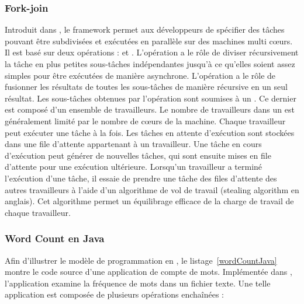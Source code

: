 \subsubsection{Fork-join}

Introduit dans , le framework  permet aux d\'eveloppeurs de sp\'ecifier des t\^aches pouvant \^etre subdivis\'ees et ex\'ecut\'ees en parall\`ele sur des machines multi cœurs. Il est bas\'e sur deux op\'erations :  et . L'op\'eration  a le r\^ole de diviser r\'ecursivement la t\^ache en plus petites sous-t\^aches ind\'ependantes jusqu'\`a ce qu'elles soient assez simples pour \^etre ex\'ecut\'ees de mani\`ere asynchrone. L'op\'eration  a le r\^ole de fusionner les r\'esultats de toutes les sous-t\^aches de mani\`ere r\'ecursive en un seul r\'esultat.
Les sous-t\^aches obtenues par l'op\'eration  sont soumises \`a un . Ce dernier est composé d'un ensemble de travailleurs. Le nombre de travailleurs dans un  est g\'en\'eralement limit\'e par le nombre de cœurs de la machine. Chaque travailleur peut ex\'ecuter une t\^ache \`a la fois. Les t\^aches en attente d'ex\'ecution sont stock\'ees dans une file d'attente appartenant \`a un travailleur. Une t\^ache en cours d'ex\'ecution peut g\'en\'erer de nouvelles t\^aches, qui sont ensuite mises en file d'attente pour une ex\'ecution ult\'erieure. Lorsqu'un travailleur a termin\'e l'ex\'ecution d'une t\^ache, il essaie de prendre une t\^ache des files d'attente des autres travailleurs \`a l'aide d'un algorithme de vol de travail (stealing algorithm en anglais). Cet algorithme permet un \'equilibrage efficace de la charge de travail de chaque travailleur.


\subsubsection{Word Count en Java}

Afin d'illustrer le mod\`ele de programmation en , le listage~\ref{wordCountJava} montre le code source d'une application de compte de mots. Impl\'ement\'ee dans , l'application examine la fr\'equence de mots dans un fichier texte. Une telle application est compos\'ee de plusieurs op\'erations encha\^in\'ees :


